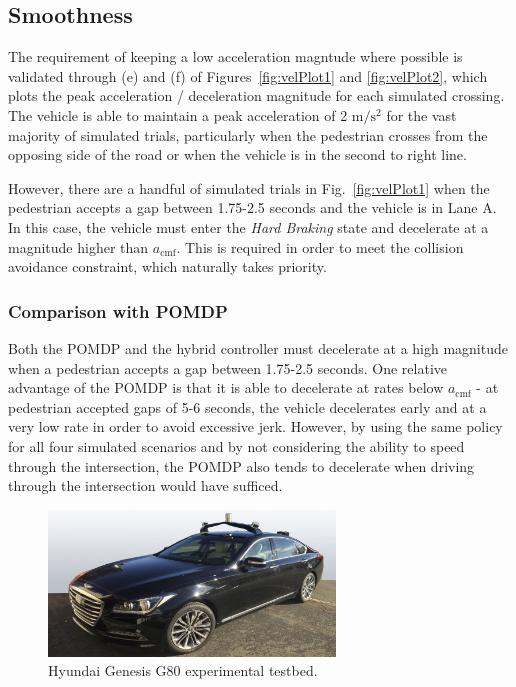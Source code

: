 \documentclass[letterpaper, 10 pt, conference]{ieeeconf}  %
\begin{document}
\subsection{Smoothness}
The requirement of keeping a low acceleration magntude where possible is validated through (e) and (f) of Figures~\ref{fig:velPlot1} and \ref{fig:velPlot2}, which plots the peak acceleration / deceleration magnitude for each simulated crossing. The vehicle is able to maintain a peak acceleration of 2 $\mathrm{m/s^2}$ for the vast majority of simulated trials, particularly when the pedestrian crosses from the opposing side of the road or when the vehicle is in the second to right line.

However, there are a handful of simulated trials in Fig.~\ref{fig:velPlot1} when the pedestrian accepts a gap between 1.75-2.5 seconds and the vehicle is in Lane A. In this case, the vehicle must enter the \textit{Hard Braking} state and decelerate at a magnitude higher than $a_\mathrm{cmf}$. This is required in order to meet the collision avoidance constraint, which naturally takes priority.

\subsubsection{Comparison with POMDP}
Both the POMDP and the hybrid controller must decelerate at a high magnitude when a pedestrian accepts a gap between 1.75-2.5 seconds. One relative advantage of the POMDP is that it is able to decelerate at rates below $a_\mathrm{cmf}$ - at pedestrian accepted gaps of 5-6 seconds, the vehicle decelerates early and at a very low rate in order to avoid excessive jerk. However, by using the same policy for all four simulated scenarios and by not considering the ability to speed through the intersection, the POMDP also tends to decelerate when driving through the intersection would have sufficed. 

\begin{figure}[h]
\centering
\includegraphics[width=3.0in]{figures/G80.jpg}
\caption{Hyundai Genesis G80 experimental testbed.}
\label{fig:g80}
\end{figure}
\end{document}
